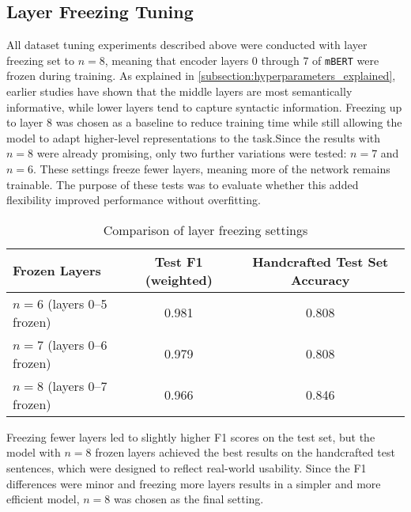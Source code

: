 \subsection{Layer Freezing Tuning}
    All dataset tuning experiments described above were conducted with layer freezing set to $n=8$, meaning that encoder layers 0 through 7 of \texttt{mBERT} were frozen during training. As explained in \autoref{subsection:hyperparameters_explained}, earlier studies have shown that the middle layers are most semantically informative, while lower layers tend to capture syntactic information. Freezing up to layer 8 was chosen as a baseline to reduce training time while still allowing the model to adapt higher-level representations to the task.Since the results with $n=8$ were already promising, only two further variations were tested: $n=7$ and $n=6$. These settings freeze fewer layers, meaning more of the network remains trainable. The purpose of these tests was to evaluate whether this added flexibility improved performance without overfitting.

    \vspace{0.8em}
    \begin{table}[ht]
        \centering
        \begin{tabularx}{\linewidth}{Xcc}
        \toprule
        \textbf{Frozen Layers} & \textbf{Test F1 (weighted)} & \textbf{Handcrafted Test Set Accuracy} \\
        \midrule
        $n=6$ (layers 0--5 frozen) & 0.981 & 0.808 \\
        $n=7$ (layers 0--6 frozen) & 0.979 & 0.808 \\
        $n=8$ (layers 0--7 frozen) & 0.966 & 0.846 \\
        \bottomrule
        \end{tabularx}
        \caption{Comparison of layer freezing settings}
    \end{table}

    Freezing fewer layers led to slightly higher F1 scores on the test set, but the model with $n=8$ frozen layers achieved the best results on the handcrafted test sentences, which were designed to reflect real-world usability. Since the F1 differences were minor and freezing more layers results in a simpler and more efficient model, $n=8$ was chosen as the final setting.

